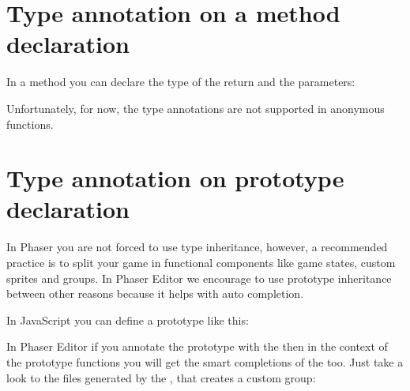 \documentclass[letterpaper,10pt,english]{sphinxmanual}
\begin{document}
\section{Type annotation on a method declaration}
\label{\detokenize{jseditor:type-annotation-on-a-method-declaration}}
In a method you can declare the type of the return and the parameters:

\noindent{}

\noindent{}

Unfortunately, for now, the type annotations are not supported in anonymous functions.


\section{Type annotation on prototype declaration}
\label{\detokenize{jseditor:type-annotation-on-prototype-declaration}}
In Phaser you are not forced to use type inheritance, however, a recommended practice is to split your game in functional components like game states, custom sprites and groups. In Phaser Editor we encourage to use prototype inheritance between other reasons because it helps with auto completion.

In JavaScript you can define a prototype like this:

\begin{sphinxVerbatim}[commandchars=\\\{\}]
  

  
  

    
\end{sphinxVerbatim}

In Phaser Editor if you annotate the prototype with the  then in the context of the prototype functions you will get the smart completions of the  too. Just take a look to the files generated by the , that creates a custom group:
\end{document}
